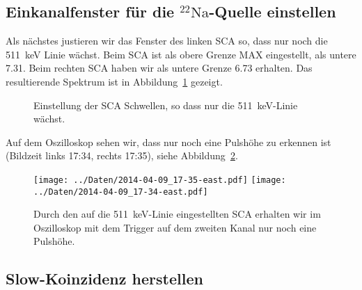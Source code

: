 \subsection{Einkanalfenster für die ${}^{22}\text{Na}$-Quelle einstellen}

Als nächstes justieren wir das
Fenster des linken SCA so, dass nur noch die \SI{511}{\kilo\electronvolt} Linie
wächst. Beim SCA ist als obere Grenze MAX eingestellt, als untere \num{7.31}.
Beim rechten SCA haben wir als untere Grenze \num{6.73} erhalten. Das
resultierende Spektrum ist in Abbildung~\ref{mca:fenster} gezeigt.

\begin{figure}[htbp]
    \centering
    \hfill
    \label{mca:fenster}
    \caption{%
        Einstellung der SCA Schwellen, so dass nur die
        \SI{511}{\kilo\electronvolt}-Linie wächst.
    }
\end{figure}

Auf dem Oszilloskop sehen wir, dass nur noch eine Pulshöhe zu erkennen ist (Bildzeit
links 17:34, rechts 17:35), siehe Abbildung~\ref{fig:eine_pulshoehe}.

\begin{figure}[htbp]
    \centering
    \texttt{[image: ../Daten/2014-04-09\_17-35-east.pdf]}
    \hfill
    \texttt{[image: ../Daten/2014-04-09\_17-34-east.pdf]}
    \caption{%
        Durch den auf die \SI{511}{\kilo\electronvolt}-Linie eingestellten SCA
        erhalten wir im Oszilloskop mit dem Trigger auf dem zweiten Kanal nur
        noch eine Pulshöhe.
    }
    \label{fig:eine_pulshoehe}
\end{figure}

\subsection{Slow-Koinzidenz herstellen}

